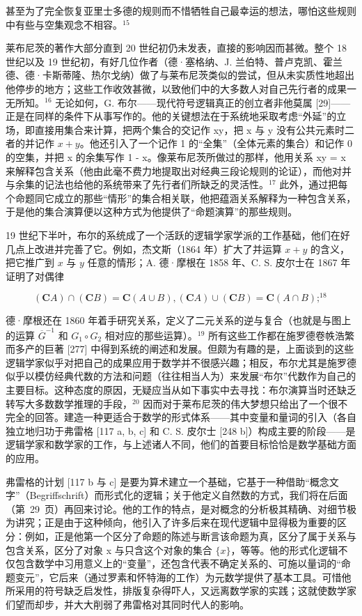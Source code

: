 甚至为了完全恢复亚里士多德的规则而不惜牺牲自己最幸运的想法，哪怕这些规则中有些与空集观念不相容。\(^{15}\)

莱布尼茨的著作大部分直到 20 世纪初仍未发表，直接的影响因而甚微。整个 18 世纪以及 19 世纪初，有好几位作者（德·塞格纳、J. 兰伯特、普卢克凯、霍兰德、德·卡斯蒂隆、热尔戈纳）做了与莱布尼茨类似的尝试，但从未实质性地超出他停步的地方；这些工作收效甚微，以致他们中的大多数人对自己先行者的成果一无所知。\(^{16}\) 无论如何，G. 布尔——现代符号逻辑真正的创立者非他莫属 {[}29{]}——正是在同样的条件下从事写作的。他的关键想法在于系统地采取考虑“外延”的立场，即直接用集合来计算，把两个集合的交记作 xy，把 x 与 y 没有公共元素时二者的并记作 \(x + y\)。他还引入了一个记作 1 的“全集”（全体元素的集合）和记作 0 的空集，并把 x 的余集写作 1 - x。像莱布尼茨所做过的那样，他用关系 xy = x 来解释包含关系（他由此毫不费力地提取出对经典三段论规则的论证），而他对并与余集的记法也给他的系统带来了先行者们所缺乏的灵活性。\(^{17}\) 此外，通过把每个命题同它成立的那些“情形”的集合相关联，他把蕴涵关系解释为一种包含关系，于是他的集合演算便以这种方式为他提供了“命题演算”的那些规则。

19 世纪下半叶，布尔的系统成了一个活跃的逻辑学家学派的工作基础，他们在好几点上改进并完善了它。例如，杰文斯（1864 年）扩大了并运算 \(x + y\) 的含义，把它推广到 \(x\) 与 \(y\) 任意的情形；A. 德·摩根在 1858 年、C. S. 皮尔士在 1867 年证明了对偶律

\[
(\mathbf {C} A) \cap (\mathbf {C} B) = \mathbf {C} (A \cup B), (\mathbf {C} A) \cup (\mathbf {C} B) = \mathbf {C} (A \cap B); ^{18}
\]

德·摩根还在 1860 年着手研究关系，定义了二元关系的逆与复合（也就是与图上的运算 \(\overline{G}^{-1}\) 和 \(G_{1} \circ G_{2}\) 相对应的那些运算）。\(^{19}\) 所有这些工作都在施罗德卷帙浩繁而多产的巨著 {[}277{]} 中得到系统的阐述和发展。但颇为有趣的是，上面谈到的这些逻辑学家似乎对把自己的成果应用于数学并不很感兴趣；相反，布尔尤其是施罗德似乎以模仿经典代数的方法和问题（往往相当人为）来发展“布尔”代数作为自己的主要目标。这种态度的原因，无疑应当从如下事实中去寻找：布尔演算当时还缺乏转写大多数数学推理的手段，\(^{20}\) 因而对于莱布尼茨的伟大梦想只给出了一个很不完全的回答。建造一种更适合于数学的形式体系——其中变量和量词的引入（各自独立地归功于弗雷格 {[}117 a, b, c{]} 和 C. S. 皮尔士 {[}248 b{]}）构成主要的阶段——是逻辑学家和数学家的工作，与上述诸人不同，他们的首要目标恰恰是数学基础方面的应用。

弗雷格的计划 {[}117 b 与 c{]} 是要为算术建立一个基础，它基于一种借助“概念文字”（Begriffschrift）而形式化的逻辑；关于他定义自然数的方式，我们将在后面（第~29~页）再回来讨论。他的工作的特点，是对概念的分析极其精确、对细节极为讲究；正是由于这种倾向，他引入了许多后来在现代逻辑中显得极为重要的区分：例如，正是他第一个区分了命题的陈述与断言该命题为真，区分了属于关系与包含关系，区分了对象 x 与只含这个对象的集合 \(\{x\}\)，等等。他的形式化逻辑不仅包含数学中习用意义上的“变量”，还包含代表不确定关系的、可施以量词的“命题变元”，它后来（通过罗素和怀特海的工作）为元数学提供了基本工具。可惜他所采用的符号缺乏启发性，排版复杂得吓人，又远离数学家的实践；这就使数学家们望而却步，并大大削弱了弗雷格对其同时代人的影响。

